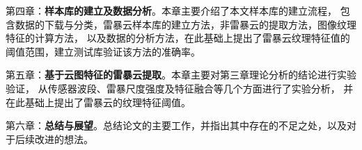 第四章：\textbf{样本库的建立及数据分析}。本章主要介绍了本文样本库的建立流程，
包含数据的下载与分类，雷暴云样本库的建立方法，非雷暴云的提取方法，图像纹理特征的计算方法，
以及数据的分析方法，在此基础上提出了雷暴云纹理特征值的阈值范围，建立测试库验证该方法的准确率。

第五章：\textbf{基于云图特征的雷暴云提取}。本章主要对第三章理论分析的结论进行实验验证，
从传感器波段、雷暴尺度强度及特征融合等几个方面进行了实验分析，
并在此基础上提出了雷暴云的纹理特征阈值。

第六章：\textbf{总结与展望}。总结论文的主要工作，并指出其中存在的不足之处，以及对于后续改进的想法。


\iffalse
本部分将从基于地面设备（气象雷达，闪电定位仪等）的雷暴探测和基于卫星遥感的雷暴监测两方面进行简要概括，
传统的探测手段已经较为成熟，但受限于雷暴的时空尺度，当前的雷暴临近预测能力还很低，
而基于卫星遥感的雷暴监测发展时间较短，针对雷暴天气的研究并不多，研究方向主要集中在判断云型和云分类方面，
由于研究方法相似，将对此方面进行一个简要的概括。
\fi